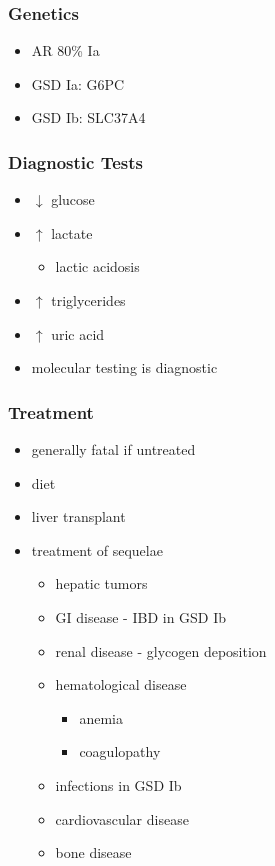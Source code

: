 \documentclass{scrartcl}
\begin{document}
\subsubsection{Genetics}
\label{sec:org180f1c0}
\begin{itemize}
\item AR 80\% Ia
\item GSD Ia: G6PC
\item GSD Ib: SLC37A4
\end{itemize}

\subsubsection{Diagnostic Tests}
\label{sec:orgfce937f}
\begin{itemize}
\item \(\downarrow\) glucose
\item \(\uparrow\) lactate
\begin{itemize}
\item lactic acidosis
\end{itemize}
\item \(\uparrow\) triglycerides
\item \(\uparrow\) uric acid
\item molecular testing is diagnostic
\end{itemize}

\subsubsection{Treatment}
\label{sec:org5dda41a}
\begin{itemize}
\item generally fatal if untreated
\item diet
\item liver transplant
\item treatment of sequelae
\begin{itemize}
\item hepatic tumors
\item GI disease - IBD in GSD Ib
\item renal disease - glycogen deposition
\item hematological disease
\begin{itemize}
\item anemia
\item coagulopathy
\end{itemize}
\item infections in GSD Ib
\item cardiovascular disease
\item bone disease
\end{itemize}
\end{itemize}
\end{document}
